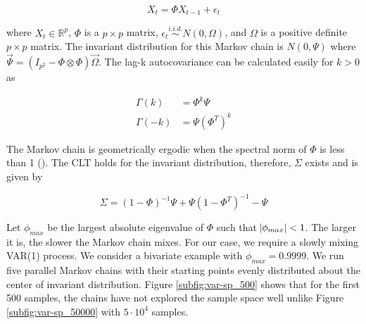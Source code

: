 \documentclass[12pt]{article}
\begin{document}
\[
X_t = \Phi X_{t-1} + \epsilon_t
\]

where $X_t \in \mathbb{R}^p$, $\Phi $ is a $p \times p $ matrix, $ \epsilon_t \overset{i.i.d.}{\sim} N(0, \Omega)$, and $\Omega$ is a positive definite $p \times p$ matrix. The invariant distribution for this Markov chain is $N(0, \Psi)$ where $\Vec{\Psi} = (I_{p^2} - \Phi \otimes \Phi)\Vec{\Omega}$. The lag-k autocovariance can be calculated easily for $k >0$ as

\begin{align*}
    \Gamma(k) &= \Phi^k\Psi\\
    \Gamma(-k) &= \Psi(\Phi^T)^k
\end{align*}

The Markov chain is geometrically ergodic when the spectral norm of $\Phi$ is less than 1 (\cite{10.2307/1427459}). The CLT holds for the invariant distribution, therefore, $\Sigma$ exists and is given by

\[
\Sigma = (1 - \Phi)^{-1}\Psi + \Psi(1 - \Phi^T)^{-1} - \Psi
\]

Let $\phi_{max}$ be the largest absolute eigenvalue of $\Phi$ such that $\abs{\phi_{max}} < 1$. The larger it is, the slower the Markov chain mixes. For our case, we require a slowly mixing VAR(1) process. We consider a bivariate example with $\phi_{max} = 0.9999$. We run five parallel Markov chains with their starting points evenly distributed about the center of invariant distribution. Figure \ref{subfig:var-sp_500} shows that for the first 500 samples, the chains have not explored the sample space well unlike Figure \ref{subfig:var-sp_50000} with $5\cdot 10^4$ samples.  
\end{document}
